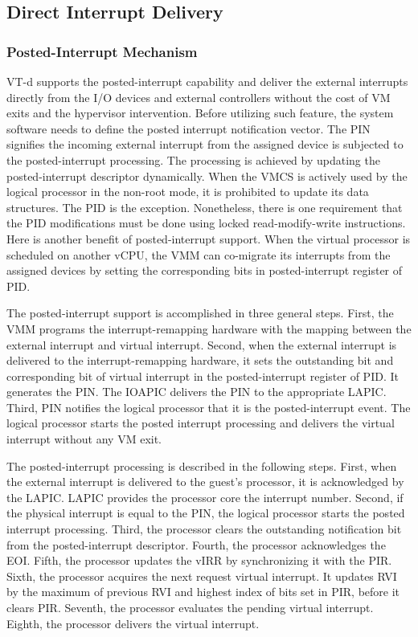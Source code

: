 \subsection{Direct Interrupt Delivery}
\subsubsection{Posted-Interrupt Mechanism}
VT-d supports the posted-interrupt capability and deliver the
external interrupts directly from the I/O devices and external
controllers without the cost of VM exits and the hypervisor
intervention. Before utilizing such feature, the system
software needs to define the posted interrupt notification
vector. The PIN signifies the incoming external interrupt from
the assigned device is subjected to the posted-interrupt
processing. The processing is achieved by updating the
posted-interrupt descriptor dynamically. When the VMCS is
actively used by the logical processor in the non-root mode,
it is prohibited to update its data structures. The PID is the
exception. Nonetheless, there is one requirement that the PID
modifications must be done using locked read-modify-write
instructions. Here is another benefit of posted-interrupt
support. When the virtual processor is scheduled on another
vCPU, the VMM can co-migrate its interrupts from the assigned
devices by setting the corresponding bits in posted-interrupt
register of PID.

The posted-interrupt support is accomplished in three general
steps. First, the VMM programs the interrupt-remapping
hardware with the mapping between the external interrupt and
virtual interrupt. Second, when the external interrupt is
delivered to the interrupt-remapping hardware, it sets the
outstanding bit and corresponding bit of virtual interrupt in
the posted-interrupt register of PID. It generates the PIN.
The IOAPIC delivers the PIN to the appropriate LAPIC. Third,
PIN notifies the logical processor that it is the
posted-interrupt event. The logical processor starts the
posted interrupt processing and delivers the virtual interrupt
without any VM exit.

The posted-interrupt processing is described in the following
steps. First, when the external interrupt is delivered to the
guest's processor, it is acknowledged by the LAPIC. LAPIC
provides the processor core the interrupt number. Second, if
the physical interrupt is equal to the PIN, the logical
processor starts the posted interrupt processing. Third, the
processor clears the outstanding notification bit from the
posted-interrupt descriptor. Fourth, the processor
acknowledges the EOI. Fifth, the processor updates the vIRR by
synchronizing it with the PIR. Sixth, the processor acquires
the next request virtual interrupt. It updates RVI by the
maximum of previous RVI and highest index of bits set in PIR,
before it clears PIR. Seventh, the processor evaluates the
pending virtual interrupt. Eighth, the processor delivers the
virtual interrupt.

